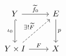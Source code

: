 \documentclass{article}
\begin{document}
    \begin{equation*}
        \begin{tikzcd}[row sep=0.4in]
            Y \ar[r, "\widetilde{f}_0"] \ar[d, "\iota_0"', hookrightarrow] & E \ar[d, "p"] \\
            Y\times I \ar[r, "F"] \ar[ur, "\ex!\widetilde{F}", dashed] & X
        \end{tikzcd}
    \end{equation*}
\end{document}
